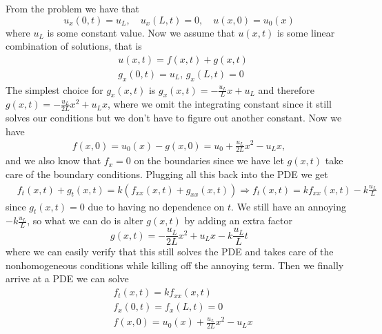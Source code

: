 \documentclass[12pt]{article}
\theoremstyle{remark}
\begin{document}
From the problem we have that
$$ u_x(0,t) = u_L, \quad u_x(L,t) = 0, \quad u(x,0) = u_0(x) $$
where $u_L$ is some constant value. Now we assume that $u(x,t)$ is some linear combination of solutions, that is
\begin{align*}
	& u(x,t) = f(x,t) + g(x,t) \\
	& g_x(0,t) = u_L, \, g_x(L,t) = 0
\end{align*} 
The simplest choice for $g_x(x,t)$ is $g_x(x,t) = -\frac{u_L}{L}x + u_L$ and therefore $g(x,t) = -\frac{u_L}{2L}x^2 + u_Lx$, where we omit the integrating constant since it still solves our conditions but we don't have to figure out another constant. Now we have
\begin{align*}
	f(x,0) = u_0(x) - g(x,0) = u_0 + \frac{u_L}{2L}x^2 - u_Lx,
\end{align*}
 and we also know that $f_x = 0$ on the boundaries since we have let $g(x,t)$ take care of the boundary conditions. Plugging all this back into the PDE we get
\begin{align*}
	& f_t(x,t) + g_t(x,t) = k(f_{xx}(x,t) + g_{xx}(x,t)) \Rightarrow f_t(x,t) = kf_{xx}(x,t) - k\frac{u_L}{L}
\end{align*}
since $g_t(x,t) = 0$ due to having no dependence on $t$. We still have an annoying $-k\frac{u_L}{L}$, so what we can do is alter $g(x,t)$ by adding an extra factor
$$ g(x,t) = -\frac{u_L}{2L}x^2 + u_Lx -k\frac{u_L}{L}t $$
where we can easily verify that this still solves the PDE and takes care of the nonhomogeneous conditions while killing off the annoying term. Then we finally arrive at a PDE we can solve
\begin{align*}
	& f_t(x,t)  = kf_{xx}(x,t) \\
	& f_x(0,t) = f_x(L,t) = 0 \\
	& f(x,0) = u_0(x) + \frac{u_L}{2L}x^2 - u_Lx
\end{align*}
\end{document}
